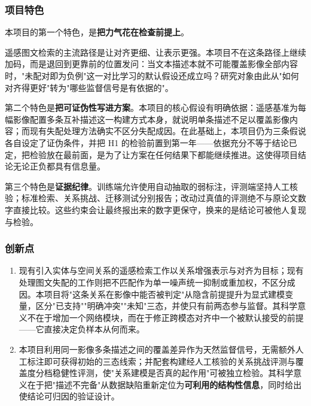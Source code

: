 \justifying
\NSFCBodyText

\subsubsection{项目特色}

本项目的第一个特色，是\textbf{把力气花在检查前提上}。

遥感图文检索的主流路径是让对齐更细、让表示更强。本项目不在这条路径上继续加码，而是退回到更靠前的位置发问：当文本描述本就不可能覆盖影像全部内容时，"未配对即为负例"这一对比学习的默认假设还成立吗？研究对象由此从"如何对齐得更好"转为"哪些监督信号是有依据的"。

第二个特色是\textbf{把可证伪性写进方案}。本项目的核心假设有明确依据：遥感基准为每幅影像配置多条互补描述这一构建方式本身，就说明单条描述不足以覆盖影像内容\cite{lu2018rsicd,yuan2022amfmn}；而现有失配处理方法确实不区分失配成因\cite{pmpguard2026,hu2023rcl}。在此基础上，本项目仍为三条假说各自设定了证伪条件，并把 H1 的检验前置到第一年——依据充分不等于结论已定，把检验放在最前面，是为了让方案在任何结果下都能继续推进。这使得项目结论无论正负都具有信息量。

第三个特色是\textbf{证据纪律}。训练端允许使用自动抽取的弱标注，评测端坚持人工核验；标准检索、关系挑战、迁移测试分别报告；改动过真值的评测绝不与原论文数字直接比较。这些约束会让最终报出来的数字更保守，换来的是结论可被他人复现与检验。

\subsubsection{创新点}

\begin{enumerate}
    \item {}现有引入实体与空间关系的遥感检索工作以关系增强表示与对齐为目标\cite{zhang2023unimodal,shui2025esrn,wu2024scat,yang2024dove,mi2024knowledgeaware}；现有处理图文失配的工作则把不匹配作为单一噪声统一抑制或重加权，不区分成因\cite{hu2023rcl,han2023msc,yang2023bicro,zhang2024npc,feng2024tripartition,pmpguard2026}。本项目将"这条关系在影像中能否被判定"从隐含前提提升为显式建模变量，区分"已支持""明确冲突""未知"三态，并使只有前两态参与监督。其科学意义不在于增加一个网络模块，而在于修正跨模态对齐中一个被默认接受的前提——它直接决定负样本从何而来。

    \item {}本项目利用同一影像多条描述之间的覆盖差异作为天然监督信号，无需额外人工标注即可获得初始的三态线索；并配套构建经人工核验的关系挑战评测与覆盖度分档稳健性评测，使"关系建模是否真的起作用"可被独立检验。其科学意义在于把"描述不完备"从数据缺陷重新定位为\textbf{可利用的结构性信息}，同时给出使结论可归因的验证设计。
\end{enumerate}


